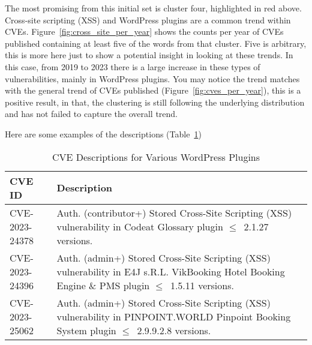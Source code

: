 The most promising from this initial set is cluster four, highlighted in red above. Cross-site scripting (XSS) and WordPress plugins are a common trend within CVEs. Figure~\ref{fig:cross_site_per_year} shows the counts per year of CVEs published containing at least five of the words from that cluster. Five is arbitrary, this is more here just to show a potential insight in looking at these trends. In this case, from 2019 to 2023 there is a large increase in these types of vulnerabilities, mainly in WordPress plugins. You may notice the trend matches with the general trend of CVEs published (Figure~\ref{fig:cves_per_year}), this is a positive result, in that, the clustering is still following the underlying distribution and has not failed to capture the overall trend.


Here are some examples of the descriptions (Table~\ref{tab:cve-descriptions})

\begin{table}[h]
	\begin{center}
		\begin{tabular}{|p{}|p{}|}
			\hline
			\textbf{CVE ID} & \textbf{Description}                                                                                                                               \\
			\hline

			CVE-2023-24378  & Auth. (contributor+) Stored Cross-Site Scripting (XSS) vulnerability in Codeat Glossary plugin $\leq$~2.1.27 versions.                             \\

			\hline

			CVE-2023-24396  & Auth. (admin+) Stored Cross-Site Scripting (XSS) vulnerability in E4J s.R.L. VikBooking Hotel Booking Engine \& PMS plugin $\leq$~1.5.11 versions. \\

			\hline

			CVE-2023-25062  & Auth. (admin+) Stored Cross-Site Scripting (XSS) vulnerability in PINPOINT.WORLD Pinpoint Booking System plugin $\leq$~2.9.9.2.8 versions.         \\

			\hline
		\end{tabular}

	\end{center}
	\caption{CVE Descriptions for Various WordPress Plugins}
	\label{tab:cve-descriptions}
\end{table}


